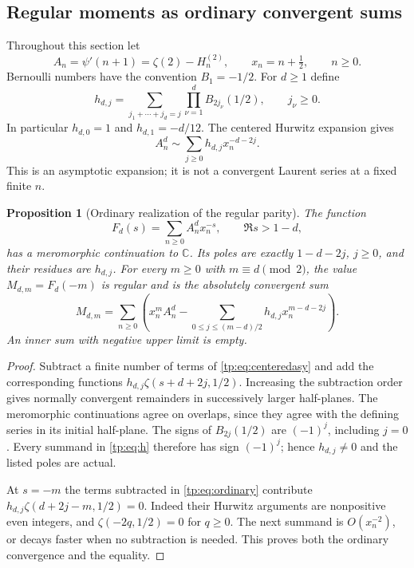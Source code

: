 \documentclass[11pt,a4paper]{article}
\numberwithin{equation}{section}
\newtheorem{proposition}[theorem]{Proposition}
\theoremstyle{definition}
\theoremstyle{remark}
\begin{document}
\subsection{Regular moments as ordinary convergent sums}

Throughout this section let
\begin{equation}\label{tp:eq:tails}
 A_n=\psi'(n+1)=\zeta(2)-H_n^{(2)},\qquad x_n=n+\tfrac12,
 \qquad n\geq0.
\end{equation}
Bernoulli numbers have the convention $B_1=-1/2$.  For $d\geq1$ define
\begin{equation}\label{tp:eq:h}
 h_{d,j}=\sum_{j_1+\cdots+j_d=j}\prod_{\nu=1}^d B_{2j_\nu}(1/2),
 \qquad j_\nu\geq0.
\end{equation}
In particular $h_{d,0}=1$ and $h_{d,1}=-d/12$.  The centered
Hurwitz expansion \cite[\S25.11]{DLMF} gives
\begin{equation}\label{tp:eq:centeredasy}
 A_n^d\sim\sum_{j\geq0}h_{d,j}x_n^{-d-2j}.
\end{equation}
This is an asymptotic expansion; it is not a convergent Laurent series
at a fixed finite $n$.

\begin{proposition}[Ordinary realization of the regular parity]
\label{tp:prop:ordinary}
The function
\[
 F_d(s)=\sum_{n\geq0}A_n^d x_n^{-s},\qquad \Re s>1-d,
\]
has a meromorphic continuation to $\mathbb C$.  Its poles are exactly
$1-d-2j$, $j\geq0$, and their residues are $h_{d,j}$.  For every
$m\geq0$ with $m\equiv d\pmod2$, the value $M_{d,m}=F_d(-m)$ is regular
and is the absolutely convergent sum
\begin{equation}\label{tp:eq:ordinary}
 M_{d,m}=\sum_{n\geq0}\left(
 x_n^m A_n^d-
 \sum_{0\leq j\leq(m-d)/2}h_{d,j}x_n^{m-d-2j}\right).
\end{equation}
An inner sum with negative upper limit is empty.
\end{proposition}

\begin{proof}
Subtract a finite number of terms of \eqref{tp:eq:centeredasy} and add
the corresponding functions $h_{d,j}\zeta(s+d+2j,1/2)$.  Increasing
the subtraction order gives normally convergent remainders in
successively larger half-planes.  The meromorphic continuations agree
on overlaps, since they agree with the defining series in its initial
half-plane.  The signs of $B_{2j}(1/2)$ are $(-1)^j$, including $j=0$.
Every summand in \eqref{tp:eq:h} therefore has sign $(-1)^j$; hence
$h_{d,j}\ne0$ and the listed poles are actual.

At $s=-m$ the terms subtracted in \eqref{tp:eq:ordinary} contribute
$h_{d,j}\zeta(d+2j-m,1/2)=0$.  Indeed their Hurwitz arguments are
nonpositive even integers, and $\zeta(-2q,1/2)=0$ for $q\geq0$.
The next summand is $O(x_n^{-2})$, or decays faster when no subtraction
is needed.  This proves both the ordinary convergence and the equality.
\end{proof}
\end{document}
